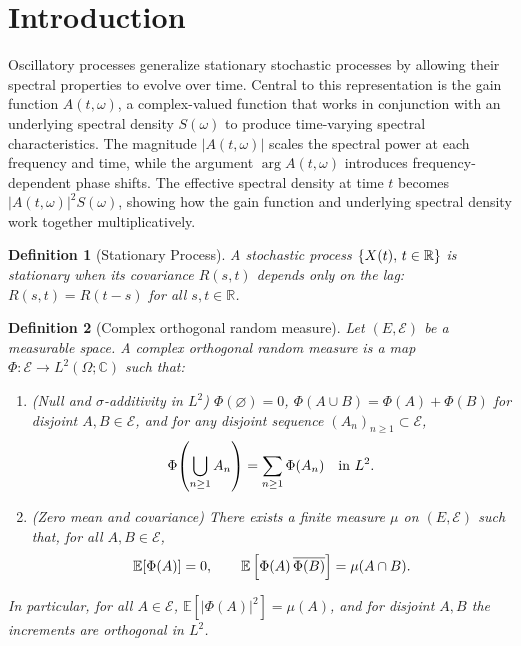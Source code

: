 \documentclass{article}
\newtheorem{definition}{Definition}
\begin{document}
\section*{Introduction}

Oscillatory processes generalize stationary stochastic processes by allowing
their spectral properties to evolve over time. Central to this representation
is the gain function $A (t, \omega)$, a complex-valued function that works in
conjunction with an underlying spectral density $S (\omega)$ to produce
time-varying spectral characteristics. The magnitude $\lvert A (t, \omega)
\rvert$ scales the spectral power at each frequency and time, while the
argument $\arg A (t, \omega)$ introduces frequency-dependent phase shifts. The
effective spectral density at time $t$ becomes $\lvert A (t, \omega) \rvert^2
S (\omega)$, showing how the gain function and underlying spectral density
work together multiplicatively.

\begin{definition}[Stationary Process]
  A stochastic process $\{X (t), \hspace{0.17em} t \in \mathbb{R}\}$ is
  stationary when its covariance $R (s, t)$ depends only on the lag: $R (s, t)
  = R (t - s)$ for all $s, t \in \mathbb{R}$.
\end{definition}

\begin{definition}[Complex orthogonal random measure]
  Let $(E, \mathcal{E})$ be a measurable space. A complex orthogonal random
  measure is a map $\Phi : \mathcal{E} \to L^2 (\Omega ; \mathbb{C})$ such
  that:
  \begin{enumerate}
    \item (Null and $\sigma$-additivity in $L^2$) $\Phi (\varnothing) = 0$,
    $\Phi (A \cup B) = \Phi (A) + \Phi (B)$ for disjoint $A, B \in
    \mathcal{E}$, and for any disjoint sequence $(A_n)_{n \ge 1} \subset
    \mathcal{E}$,
    \[ \Phi \hspace{-0.17em} \left( \bigcup_{n \ge 1} A_n \right) = \sum_{n
       \ge 1} \Phi (A_n)  \quad \text{in } L^2 . \]
    \item (Zero mean and covariance) There exists a finite measure $\mu$ on
    $(E, \mathcal{E})$ such that, for all $A, B \in \mathcal{E}$,
    \[ \mathbb{E} [\Phi (A)] = 0, \qquad \mathbb{E} \left[ \Phi (A)
       \hspace{0.17em} \overline{\Phi (B)} \right] = \mu (A \cap B) . \]
  \end{enumerate}
  In particular, for all $A \in \mathcal{E}$, $\mathbb{E} [| \Phi (A) |^2] =
  \mu (A)$, and for disjoint $A, B$ the increments are orthogonal in $L^2$.
\end{definition}
\end{document}
